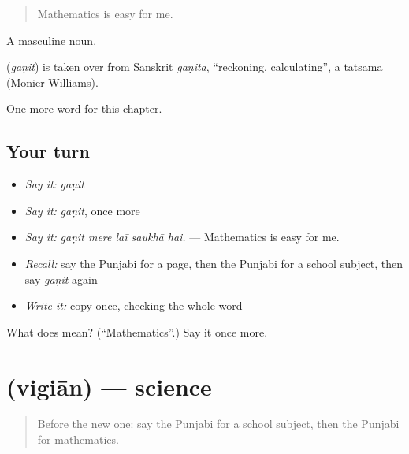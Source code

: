 \begin{quote}
Mathematics is easy for me.
\end{quote}

A masculine noun.

\begin{cousinweb}
\textbf{} (\emph{gaṇit}) is taken over from Sanskrit \emph{gaṇita}, \textquotedblleft{}reckoning, calculating\textquotedblright{}, a tatsama (Monier-Williams).
\end{cousinweb}

\begin{grammarlens}[title={What you've built}]
One more word for this chapter.
\end{grammarlens}

\subsection*{Your turn}
\begin{itemize}
\raggedright
  \item \emph{Say it:} \emph{gaṇit}
  \item \emph{Say it:} \emph{gaṇit}, once more
  \item \emph{Say it:} \emph{gaṇit mere laī saukhā hai.} — Mathematics is easy for me.
  \item \emph{Recall:} say the Punjabi for a page, then the Punjabi for a school subject, then say \emph{gaṇit} again
  \item \emph{Write it:} copy \textbf{} once, checking the whole word
\end{itemize}

\begin{tcolorbox}[breakable,colback=teal!4,colframe=teal!35!black,title={Before you move on}]
What does  mean? (\textquotedblleft{}Mathematics\textquotedblright{}.) Say it once more.
\end{tcolorbox}
\section[\texorpdfstring{\pa{ਵਿਗਿਆਨ} (vigiān)}{ਵਿਗਿਆਨ (vigiān)}]{ (vigiān) — science}

\label{lesson:PA-C358-vigian}



\begin{quote}
Before the new one: say the Punjabi for a school subject, then the Punjabi for mathematics.
\end{quote}

